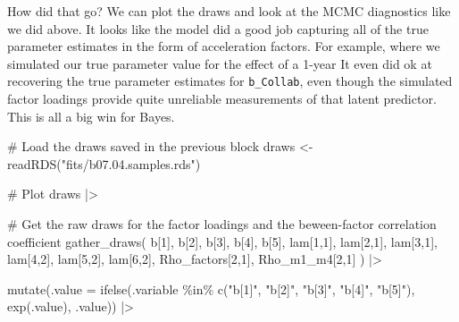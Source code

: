 \documentclass[
  letterpaper,
  DIV=11,
  numbers=noendperiod]{scrreprt}
\newenvironment{Shaded}{\begin{snugshade}}{\end{snugshade}}
\newcommand{\AttributeTok}[1]{\textcolor[rgb]{0.40,0.45,0.13}{#1}}
\newcommand{\CommentTok}[1]{\textcolor[rgb]{0.37,0.37,0.37}{#1}}
\newcommand{\FunctionTok}[1]{\textcolor[rgb]{0.28,0.35,0.67}{#1}}
\newcommand{\NormalTok}[1]{\textcolor[rgb]{0.00,0.23,0.31}{#1}}
\newcommand{\OtherTok}[1]{\textcolor[rgb]{0.00,0.23,0.31}{#1}}
\newcommand{\SpecialCharTok}[1]{\textcolor[rgb]{0.37,0.37,0.37}{#1}}
\newcommand{\StringTok}[1]{\textcolor[rgb]{0.13,0.47,0.30}{#1}}
\begin{document}
How did that go? We can plot the draws and look at the MCMC diagnostics
like we did above. It looks like the model did a good job capturing all
of the true parameter estimates in the form of acceleration factors. For
example, where we simulated our true parameter value for the effect of a
1-year It even did ok at recovering the true parameter estimates for
\texttt{b\_Collab}, even though the simulated factor loadings provide
quite unreliable measurements of that latent predictor. This is all a
big win for Bayes.

\begin{Shaded}
\begin{Highlighting}[]
\CommentTok{\# Load the draws saved in the previous block}
\NormalTok{draws }\OtherTok{\textless{}{-}} \FunctionTok{readRDS}\NormalTok{(}\StringTok{"fits/b07.04.samples.rds"}\NormalTok{)}

\CommentTok{\# Plot}
\NormalTok{draws }\SpecialCharTok{|\textgreater{}}

  \CommentTok{\# Get the raw draws for the factor loadings and the beween{-}factor correlation coefficient}
  \FunctionTok{gather\_draws}\NormalTok{(}
    \StringTok{\textasciigrave{}}\AttributeTok{b[1]}\StringTok{\textasciigrave{}}\NormalTok{,}
    \StringTok{\textasciigrave{}}\AttributeTok{b[2]}\StringTok{\textasciigrave{}}\NormalTok{,}
    \StringTok{\textasciigrave{}}\AttributeTok{b[3]}\StringTok{\textasciigrave{}}\NormalTok{,}
    \StringTok{\textasciigrave{}}\AttributeTok{b[4]}\StringTok{\textasciigrave{}}\NormalTok{,}
    \StringTok{\textasciigrave{}}\AttributeTok{b[5]}\StringTok{\textasciigrave{}}\NormalTok{,}
    \StringTok{\textasciigrave{}}\AttributeTok{lam[1,1]}\StringTok{\textasciigrave{}}\NormalTok{,}
    \StringTok{\textasciigrave{}}\AttributeTok{lam[2,1]}\StringTok{\textasciigrave{}}\NormalTok{,}
    \StringTok{\textasciigrave{}}\AttributeTok{lam[3,1]}\StringTok{\textasciigrave{}}\NormalTok{,}
    \StringTok{\textasciigrave{}}\AttributeTok{lam[4,2]}\StringTok{\textasciigrave{}}\NormalTok{,}
    \StringTok{\textasciigrave{}}\AttributeTok{lam[5,2]}\StringTok{\textasciigrave{}}\NormalTok{,}
    \StringTok{\textasciigrave{}}\AttributeTok{lam[6,2]}\StringTok{\textasciigrave{}}\NormalTok{,}
    \StringTok{\textasciigrave{}}\AttributeTok{Rho\_factors[2,1]}\StringTok{\textasciigrave{}}\NormalTok{,}
    \StringTok{\textasciigrave{}}\AttributeTok{Rho\_m1\_m4[2,1]}\StringTok{\textasciigrave{}}
\NormalTok{  ) }\SpecialCharTok{|\textgreater{}}

  \FunctionTok{mutate}\NormalTok{(}\AttributeTok{.value =} \FunctionTok{ifelse}\NormalTok{(.variable }\SpecialCharTok{\%in\%} \FunctionTok{c}\NormalTok{(}\StringTok{"b[1]"}\NormalTok{, }\StringTok{"b[2]"}\NormalTok{, }\StringTok{"b[3]"}\NormalTok{, }\StringTok{"b[4]"}\NormalTok{, }\StringTok{"b[5]"}\NormalTok{), }\FunctionTok{exp}\NormalTok{(.value), .value)) }\SpecialCharTok{|\textgreater{}}
  

\end{Highlighting}
\end{Shaded}
\end{document}
